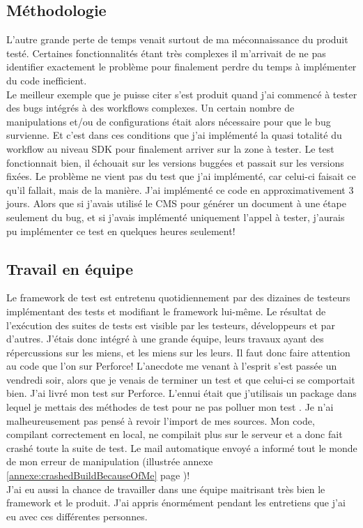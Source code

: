 \subsection{M\'{e}thodologie}
L'autre grande perte de temps venait surtout de ma m\'{e}connaissance du produit test\'{e}. Certaines fonctionnalit\'{e}s \'{e}tant tr\`{e}s complexes il m'arrivait de ne pas identifier exactement le probl\`{e}me pour finalement perdre du temps \`{a} impl\'{e}menter du code inefficient.\\
Le meilleur exemple que je puisse citer s'est produit quand j'ai commenc\'{e} \`{a} tester des bugs int\'{e}gr\'{e}s \`{a} des workflows complexes. Un certain nombre de manipulations et/ou de configurations \'{e}tait alors n\'{e}cessaire pour que le bug survienne. Et c'est dans ces conditions que j'ai impl\'{e}ment\'{e} la quasi totalit\'{e} du workflow au niveau SDK pour finalement arriver sur la zone \`{a} tester. Le test fonctionnait bien, il \'{e}chouait sur les versions bugg\'{e}es et passait sur les versions fix\'{e}es. Le probl\`{e}me ne vient pas du test que j'ai impl\'{e}ment\'{e}, car celui-ci faisait ce qu'il fallait, mais de la mani\`{e}re. J'ai impl\'{e}ment\'{e} ce code en approximativement 3 jours. Alors que si j'avais utilis\'{e} le CMS pour g\'{e}n\'{e}rer un document \`{a} une \'{e}tape seulement du bug, et si j'avais impl\'{e}ment\'{e} uniquement l'appel \`{a} tester, j'aurais pu impl\'{e}menter ce test en quelques heures seulement!

\subsection{Travail en \'{e}quipe}
Le framework de test est entretenu quotidiennement par des dizaines de testeurs impl\'{e}mentant des tests et modifiant le framework lui-m\^{e}me. Le r\'{e}sultat de l'ex\'{e}cution des suites de tests est visible par les testeurs, d\'{e}veloppeurs et par d'autres. J'\'{e}tais donc int\'{e}gr\'{e} \`{a} une grande \'{e}quipe, leurs travaux ayant des r\'{e}percussions sur les miens, et les miens sur les leurs. Il faut donc faire attention au code que l'on  sur Perforce! L'anecdote me venant \`{a} l'esprit s'est pass\'{e}e un vendredi soir, alors que je venais de terminer un test et que celui-ci se comportait bien. J'ai livr\'{e} mon test sur Perforce. L'ennui \'{e}tait que j'utilisais un package dans lequel je mettais des m\'{e}thodes de test pour ne pas polluer mon test . Je n'ai malheureusement pas pens\'{e} \`{a} revoir l'import de mes sources. Mon code, compilant correctement en local, ne compilait plus sur le serveur et a donc fait crash\'{e} toute la suite de test. Le mail automatique envoy\'{e} a inform\'{e} tout le monde de mon erreur de manipulation (illustr\'{e}e annexe \ref{annexe:crashedBuildBecauseOfMe} page \pageref{annexe:crashedBuildBecauseOfMe})!\\

J'ai eu aussi la chance de travailler dans une \'{e}quipe maitrisant tr\`{e}s bien le framework et le produit. J'ai appris \'{e}norm\'{e}ment pendant les entretiens que j'ai eu avec ces diff\'{e}rentes personnes.

